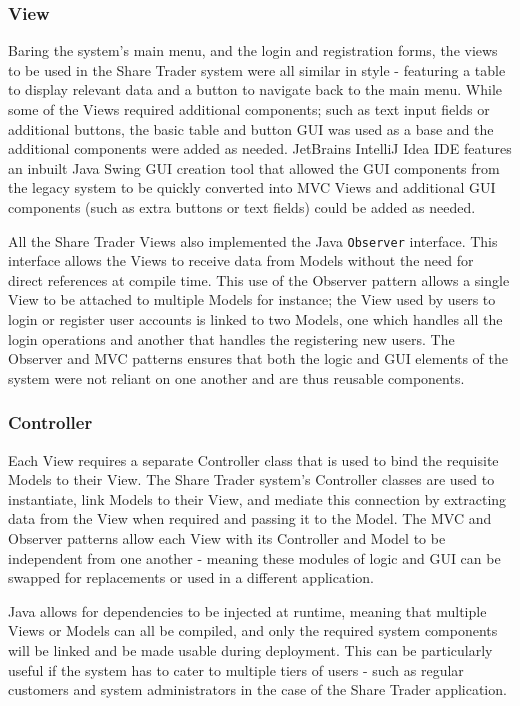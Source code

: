 \documentclass[12pt, a4paper,titlepage]{article}
\begin{document}


\subsubsection{View}
Baring the system's main menu, and the login and registration forms, the views
to be used in the Share Trader system were all similar in style - featuring a
table to display relevant data and a button to navigate back to the main menu.
While some of the Views required additional components; such as text input
fields or additional buttons, the basic table and button GUI was used as a
base and the additional components were added as needed.  
JetBrains IntelliJ Idea IDE features an inbuilt Java Swing GUI creation tool
that allowed the GUI components from the legacy system to be quickly converted
into MVC Views and additional GUI components (such as extra buttons or text
fields) could be added as needed.

All the Share Trader Views also implemented the Java {\tt Observer} interface. 
This interface allows the Views to receive data from Models without the
need for direct references at compile time. 
This use of the Observer pattern allows a single View to be attached to
multiple Models for instance; the View used by users to login or register user
accounts is linked to two Models, one which handles all the login operations
and another that handles the registering new users. 
The Observer and MVC patterns ensures that both the logic and GUI elements of
the system were not reliant on one another and are thus reusable components.

\subsubsection{Controller}
Each View requires a separate Controller class that is used to bind the
requisite Models to their View. 
The Share Trader system's Controller classes are used to instantiate, link
Models to their View, and mediate this connection by extracting data from the
View when required and passing it to the Model. 
The MVC and Observer patterns allow each View with its Controller and Model to
be independent from one another - meaning these modules of logic and GUI can
be swapped for replacements or used in a different application.

Java allows for dependencies to be injected at runtime, meaning that
multiple Views or Models can all be compiled, and only the required system
components will be linked and be made usable during deployment. 
This can be particularly useful if the system has to cater to multiple tiers
of users - such as regular customers and system administrators in the case of
the Share Trader application.
\end{document}

